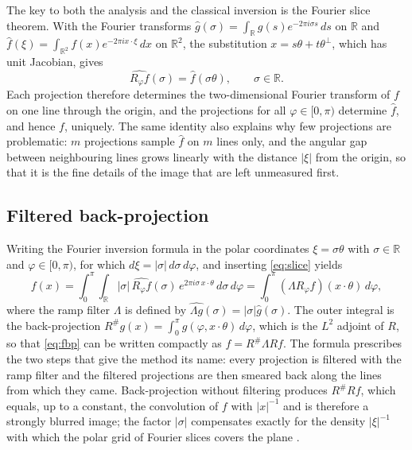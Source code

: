\documentclass[11pt,a4paper]{article}
\numberwithin{equation}{section}
\theoremstyle{remark}
\newcommand{\R}{\mathbb{R}}
\begin{document}
The key to both the analysis and the classical inversion is the Fourier slice theorem. With the Fourier transforms $\hat g(\sigma)=\int_\R g(s)e^{-2\pi i\sigma s}\,ds$ on $\R$ and $\hat f(\xi)=\int_{\R^2}f(x)e^{-2\pi i x\cdot\xi}\,dx$ on $\R^2$, the substitution $x=s\theta+t\theta^\perp$, which has unit Jacobian, gives
\begin{equation}\label{eq:slice}
  \widehat{R_\varphi f}(\sigma)=\hat f(\sigma\theta),\qquad\sigma\in\R .
\end{equation}
Each projection therefore determines the two-dimensional Fourier transform of $f$ on one line through the origin, and the projections for all $\varphi\in[0,\pi)$ determine $\hat f$, and hence $f$, uniquely. The same identity also explains why few projections are problematic: $m$ projections sample $\hat f$ on $m$ lines only, and the angular gap between neighbouring lines grows linearly with the distance $|\xi|$ from the origin, so that it is the fine details of the image that are left unmeasured first.

\subsection{Filtered back-projection}\label{sec:radon-fbp}

Writing the Fourier inversion formula in the polar coordinates $\xi=\sigma\theta$ with $\sigma\in\R$ and $\varphi\in[0,\pi)$, for which $d\xi=|\sigma|\,d\sigma\,d\varphi$, and inserting \eqref{eq:slice} yields
\begin{equation}\label{eq:fbp}
  f(x)=\int_0^\pi\!\int_{\R}|\sigma|\,\widehat{R_\varphi f}(\sigma)\,e^{2\pi i\sigma\,x\cdot\theta}\,d\sigma\,d\varphi
      =\int_0^\pi (\Lambda R_\varphi f)(x\cdot\theta)\,d\varphi ,
\end{equation}
where the ramp filter $\Lambda$ is defined by $\widehat{\Lambda g}(\sigma)=|\sigma|\hat g(\sigma)$. The outer integral is the back-projection $R^\#g(x)=\int_0^\pi g(\varphi,x\cdot\theta)\,d\varphi$, which is the $L^2$ adjoint of $R$, so that \eqref{eq:fbp} can be written compactly as $f=R^\#\Lambda Rf$. The formula prescribes the two steps that give the method its name: every projection is filtered with the ramp filter and the filtered projections are then smeared back along the lines from which they came. Back-projection without filtering produces $R^\#Rf$, which equals, up to a constant, the convolution of $f$ with $|x|^{-1}$ and is therefore a strongly blurred image; the factor $|\sigma|$ compensates exactly for the density $|\xi|^{-1}$ with which the polar grid of Fourier slices covers the plane \citep{natterer2001,kak2001}.
\end{document}
